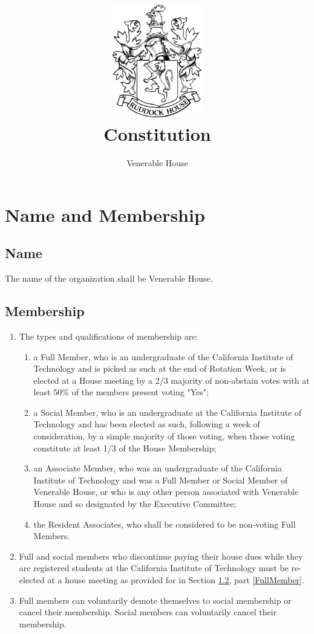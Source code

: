 \documentclass[10pt]{article} %
\title{\includegraphics[width=1.55in]{ruddock_crest.png} \\ Constitution}
\author{Venerable House}
\begin{document}
\maketitle

\section{Name and Membership}
\subsection{Name}
The name of the organization shall be Venerable House.
\subsection{Membership}
\label{Membership}
\begin{enumerate}
\item The types and qualifications of membership are:
\begin{enumerate}
\item \label{FullMember} a Full Member, who is an undergraduate of the California Institute of Technology and is picked as such at the end of Rotation Week, or is elected at a House meeting by a 2/3 majority of non-abstain votes with at least 50\% of the members present voting "Yes";
\item a Social Member, who is an undergraduate at the California Institute of Technology and has been elected as such, following a week of consideration, by a simple majority of those voting, when those voting constitute at least 1/3 of the House Membership;
\item an Associate Member, who was an undergraduate of the California Institute of Technology and was a Full Member or Social Member of Venerable House, or who is any other person associated with Venerable House and so designated by the Executive Committee;
\item the Resident Associates, who shall be considered to be non-voting Full Members.
\end{enumerate}
\item Full and social members who discontinue paying their house dues while they are registered students at the California Institute of Technology must be re-elected at a house meeting as provided for in Section \ref{Membership}, part \ref{FullMember}.
\item Full members can voluntarily demote themselves to social membership or cancel their membership. Social members can voluntarily cancel their membership.
\end{enumerate}
\end{document}
